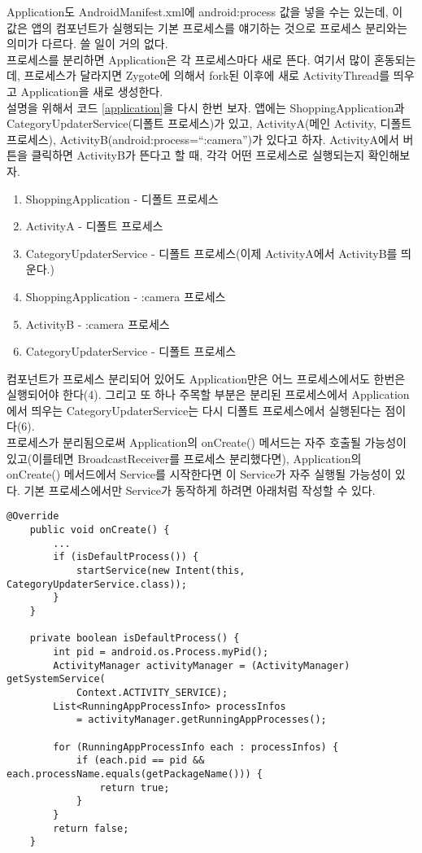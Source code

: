 Application도 AndroidManifest.xml에 android:process 값을 넣을 수는 있는데, 이 값은 앱의 컴포넌트가 실행되는 기본 프로세스를 얘기하는 것으로 프로세스 분리와는 의미가 다르다. 쓸 일이 거의 없다.\\

프로세스를 분리하면 Application은 각 프로세스마다 새로 뜬다. 여기서 많이 혼동되는데, 프로세스가 달라지면 Zygote에 의해서 fork된 이후에 새로 ActivityThread를 띄우고 Application을 새로 생성한다.\\

설명을 위해서 코드 \ref{application}을 다시 한번 보자. 
앱에는 ShoppingApplication과 CategoryUpdaterService(디폴트 프로세스)가 있고, ActivityA(메인 Activity, 디폴트 프로세스), ActivityB(android:process=``:camera'')가 있다고 하자. 
ActivityA에서 버튼을 클릭하면 ActivityB가 뜬다고 할 때, 각각 어떤 프로세스로 실행되는지 확인해보자.

\begin{enumerate}
\item ShoppingApplication - 디폴트 프로세스
\item ActivityA - 디폴트 프로세스
\item CategoryUpdaterService - 디폴트 프로세스(이제 ActivityA에서 ActivityB를 띄운다.)
\item ShoppingApplication - :camera 프로세스
\item ActivityB - :camera 프로세스
\item CategoryUpdaterService - 디폴트 프로세스
\end{enumerate}

컴포넌트가 프로세스 분리되어 있어도 Application만은 어느 프로세스에서도 한번은 실행되어야 한다(4).
그리고 또 하나 주목할 부분은 분리된 프로세스에서 Application에서 띄우는 CategoryUpdaterService는 다시 디폴트 프로세스에서 실행된다는 점이다(6).\\

프로세스가 분리됨으로써 Application의 onCreate() 메서드는 자주 호출될 가능성이 있고(이를테면 BroadcastReceiver를 프로세스 분리했다면), Application의 onCreate() 메서드에서 Service를 시작한다면 이 Service가 자주 실행될 가능성이 있다.
기본 프로세스에서만 Service가 동작하게 하려면 아래처럼 작성할 수 있다.

\begin{lstlisting}[frame=single] 
	@Override
	public void onCreate() {
		...
		if (isDefaultProcess()) {
			startService(new Intent(this, CategoryUpdaterService.class));
		}
	}
	
	private boolean isDefaultProcess() {
		int pid = android.os.Process.myPid();
        ActivityManager activityManager = (ActivityManager) getSystemService(
        	Context.ACTIVITY_SERVICE);                      
        List<RunningAppProcessInfo> processInfos 
        	= activityManager.getRunningAppProcesses();     

        for (RunningAppProcessInfo each : processInfos) {                          
            if (each.pid == pid && each.processName.equals(getPackageName())) {                              
                return true;
            }                         
        }
        return false;
    }
\end{lstlisting}

